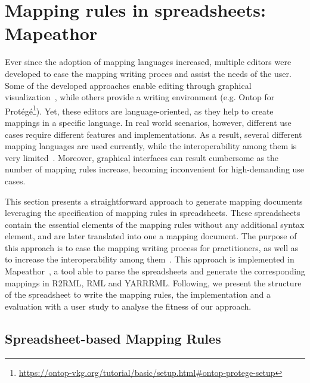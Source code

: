 \section{Mapping rules in spreadsheets: Mapeathor}
\label{sec:chp5_mapeathor}

Ever since the adoption of mapping languages increased, multiple  editors were developed to ease the mapping writing proces and assist the needs of the user. Some of the developed approaches enable editing through graphical visualization~\cite{heyvaert2016rmleditor,sicilia2017map}, while others provide a writing environment (e.g. Ontop for Protégé\footnote{\url{https://ontop-vkg.org/tutorial/basic/setup.html\#ontop-protege-setup}}). Yet, these editors are language-oriented, as they help to create mappings in a specific language. In real world scenarios, however, different use cases require different features and implementations. As a result, several different mapping languages are used currently, while the interoperability among them is very limited~\cite{iglesias2022devising}. Moreover, graphical interfaces can result cumbersome as the number of mapping rules increase, becoming inconvenient for high-demanding use cases. 


This section presents a straightforward approach to generate mapping documents leveraging the specification of mapping rules in spreadsheets. These spreadsheets contain the essential elements of the mapping rules without any additional syntax element, and are later translated into one a mapping document. The purpose of this approach is to ease the mapping writing process for practitioners, as well as to increase the interoperability among them~\cite{corcho2020towards, iglesias2022devising}. This approach is implemented in Mapeathor~\cite{iglesias-molina_2023_5973906}, a tool able to parse the spreadsheets and generate the corresponding mappings in R2RML, RML and YARRRML. Following, we present the structure of the spreadsheet to write the mapping rules, the implementation and a evaluation with a user study to analyse the fitness of our approach.

\subsection{Spreadsheet-based Mapping Rules}
\label{sec:chp5_spreadsheet_design}

